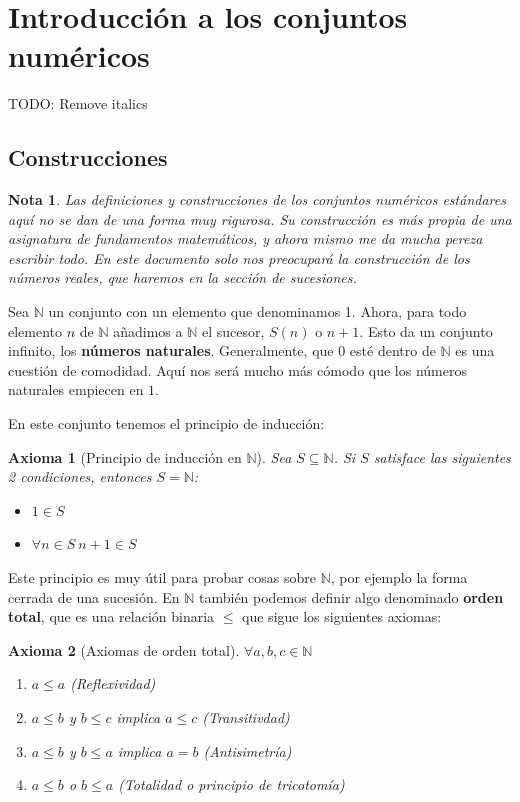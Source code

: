 \documentclass{article}
\author{NyKi}
\date{Diciembre 2024}
\newtheorem{axiom}{Axioma}
\newtheorem{note}{Nota}
\newcommand{\naturales}{\mathbb{N}}
\begin{document}
\section{Introducción a los conjuntos numéricos}
TODO: Remove italics

\subsection{Construcciones}

\begin{note}
Las definiciones y construcciones de los conjuntos numéricos estándares aquí no se dan de una forma muy rigurosa. Su construcción es más propia de una asignatura de fundamentos matemáticos, y ahora mismo me da mucha pereza escribir todo. En este documento solo nos preocupará la construcción de los números reales, que haremos en la sección de sucesiones.
\end{note}

Sea $\mathbb{N}$ un conjunto con un elemento que denominamos 1. Ahora, para todo elemento $n$ de $\naturales$ añadimos a $\naturales$ el sucesor, $S(n)$ o $n+1$. Esto da un conjunto infinito, los \textbf{números naturales}. Generalmente, que $0$ esté dentro de $\mathbb{N}$ es una cuestión de comodidad. Aquí nos será mucho más cómodo que los números naturales empiecen en $1$.

En este conjunto tenemos el principio de inducción:

\begin{axiom}[Principio de inducción en $\naturales$]
Sea $S \subseteq \mathbb{N}$. Si $S$ satisface las siguientes 2 condiciones, entonces $S = \mathbb{N}$:
\begin{itemize}
\item
$1 \in S$
\item
$\forall n \in S \ n+1 \in S$
\end{itemize}
\end{axiom}

Este principio es muy útil para probar cosas sobre $\mathbb{N}$, por ejemplo la forma cerrada de una sucesión. En $\mathbb{N}$ también podemos definir algo denominado \textbf{orden total}, que es una relación binaria  $\leq$ que sigue los siguientes axiomas:
\begin{axiom}[Axiomas de orden total]
$\forall a,b,c \in \mathbb{N}$
\begin{enumerate}
	\item
	$a \leq a$ (Reflexividad)
	\item
	$a \leq b$ y $b \leq c$ implica $a \leq c$ (Transitivdad)
	\item
	$a \leq b$ y $b \leq a$ implica $a = b$ (Antisimetría)
	\item
	$a \leq b$ o $b \leq a$ (Totalidad o principio de tricotomía)
\end{enumerate}
\end{axiom}
\end{document}
